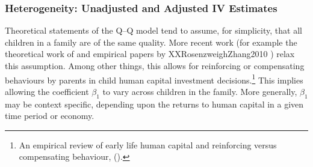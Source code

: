 \documentclass[subeqn]{article}
\begin{document}
\begin{spacing}{1.4}

\subsubsection{Heterogeneity: Unadjusted and Adjusted IV Estimates}
Theoretical statements of the Q--Q model tend to assume, for simplicity, that all
children in a family are of the same quality. More recent work (for example the 
theoretical work of \citet{AizerCunha2012} and empirical papers by XXRosenzweighZhang2010 \citet{Brinchetal2016,
  MogstadWiswall2016}) relax this assumption. Among 
other things, this allows for reinforcing or compensating behaviours by parents in child human 
capital investment decisions.\footnote{An empirical review of early life human 
capital and reinforcing versus compensating behaviour, (\citet{AlmondMazumder2013}).} This implies allowing the coefficient $\beta_1$ to vary across children in the family. 
More generally, $\beta_1$ may be context specific, depending upon the returns to 
human capital in a given time period or economy.


\end{spacing}
\end{document}
